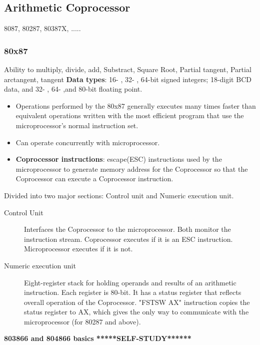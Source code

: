 \subsection{Arithmetic Coprocessor}
8087, 80287, 80387X, ..... \newline
  \subsubsection{80x87}
  Ability to multiply, divide, add, Substract, Square Root, Partial tangent, Partial arctangent, tangent
  \textbf{Data types}: 16- , 32- , 64-bit signed integers; 18-digit BCD data, and 32- , 64- ,and 80-bit floating point.
  \begin{itemize}
    \item Operations performed by the 80x87 generally executes many times faster than equivalent operations written with the most efficient program that use the microprocessor's normal instruction set.
    \item Can operate concurrently with microprocessor.
    \item \textbf{Coprocessor instructions}: escape(ESC) instructions used by the microprocessor to generate memory address for the Coprocessor so that the Coprocessor can execute a Coprocessor instruction.
  \end{itemize}
Divided into two major sections: Control unit and Numeric execution unit.
\begin{description}
  \item[Control Unit] Interfaces the Coprocessor to the microprocessor. Both monitor the instruction stream. Coprocessor executes if it is an ESC instruction. Microprocessor executes if it is not.

  \item[Numeric execution unit] Eight-register stack for holding operands and results of an arithmetic instruction. Each register is 80-bit. It has a status register that reflects overall operation of the Coprocessor. "FSTSW AX" instruction copies the status register to AX, which gives the only way to communicate with the microprocessor (for 80287 and above).
\end{description}

\textbf{803866 and 804866 basics  *****SELF-STUDY****** }
